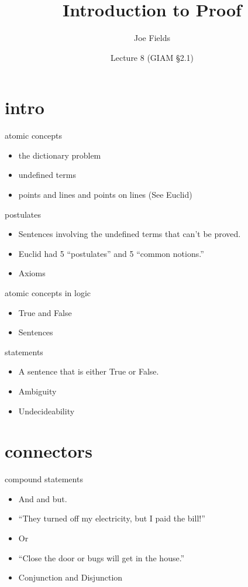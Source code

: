\documentclass[landscape]{beamer}
\author{Joe Fields}
\title{Introduction to Proof}
\date{Lecture 8 (GIAM \S 2.1)}
\institute[SCSU]{ {\tt fieldsj1@southernct.edu} }
\begin{document}
\begin{frame}[plain]
  \titlepage
\end{frame}


\section{intro}

\begin{frame}{atomic concepts}
\begin{itemize}
\item the dictionary problem \pause
\item undefined terms \pause
\item points and lines and points on lines \pause (See Euclid) 
\end{itemize}
\end{frame}

\begin{frame}{postulates}
\begin{itemize}
\item Sentences involving the undefined terms that can't be proved. \pause
\item Euclid had 5 ``postulates'' and 5 ``common notions.'' \pause
\item Axioms
\end{itemize}
\end{frame}

\begin{frame}{atomic concepts in logic}
\begin{itemize}
\item True and False 
\item Sentences
\end{itemize}
\end{frame}

\begin{frame}{statements}
\begin{itemize}
\item A sentence that is either True or False.\pause
\item Ambiguity \pause
\item Undecideability 
\end{itemize}
\end{frame}

\section{connectors}

\begin{frame}{compound statements}
\begin{itemize}
\item And and but. \pause
\item ``They turned off my electricity, but I paid the bill!'' \pause
\item Or \pause
\item ``Close the door or bugs will get in the house.'' \pause
\item Conjunction and Disjunction
\end{itemize}
\end{frame}
\end{document}
